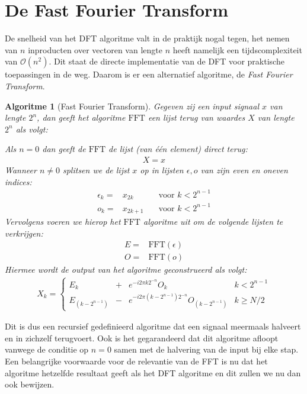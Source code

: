 \documentclass[11pt]{amsart}
\newcommand{\e}{\epsilon}
\renewcommand{\O}{\mathcal{O}}
\newcommand{\FFT}{\text{FFT}}
\newtheorem*{algo}{Algoritme}
\theoremstyle{remark}
\newcommand{\eq}[1]{\begin{eqnarray*} #1 \end{eqnarray*}}
\begin{document}
\section{De Fast Fourier Transform}
De snelheid van het DFT algoritme valt in de praktijk nogal tegen, het nemen van $n$ inproducten over vectoren 
van lengte $n$ heeft namelijk een tijdscomplexiteit van $\O(n^2)$. Dit staat de directe implementatie van de DFT 
voor praktische toepassingen in de weg. Daarom is er een alternatief algoritme, de \emph{Fast Fourier Transform}.  \bigskip

\begin{algo}[Fast Fourier Transform]
Gegeven zij een input signaal $x$ van lengte $2^n$, dan geeft het algoritme $\FFT$ 
een lijst terug van waardes $X$ van lengte $2^n$ als volgt:

Als $n=0$ dan geeft de $\FFT$ de lijst (van \'e\'en element) direct terug:
\eq{
X = x
}
Wanneer $n\neq0$ splitsen we de lijst $x$ op in lijsten $\e,o$ van zijn even en oneven indices:
\eq{
  \e_k   =& x_{2k}   &\quad \text{voor } k < 2^{n-1}\\
   o_k   =& x_{2k+1} &\quad \text{voor } k < 2^{n-1}
}
Vervolgens voeren we hierop het $\FFT$ algoritme uit om de volgende lijsten te verkrijgen:
\eq{
  E =& \FFT(\e) \\
  O =& \FFT(o)
}
Hiermee wordt de output van het algoritme geconstrueerd als volgt:
\eq{
  X_k = \left\{\begin{array}{llll}
    E_k         &+& e^{-i2\pi k2^{-n}} O_k &  k< 2^{n-1} \\
    E_{(k-2^{n-1})} &-& e^{-i2\pi (k-2^{n-1})2^{-n}} O_{(k-2^{n-1})} &  k\geq N/2 
  \end{array}\right.
}
\end{algo}

Dit is dus een recursief gedefinieerd algoritme dat een signaal meermaals halveert en in zichzelf terugvoert.
Ook is het gegarandeerd dat dit algoritme afloopt vanwege de conditie op $n=0$ samen met de halvering van de input bij elke stap. Een belangrijke voorwaarde voor de relevantie van de FFT is nu dat het algoritme hetzelfde resultaat geeft als het DFT algoritme en dit zullen we nu dan ook bewijzen. 
\end{document}
